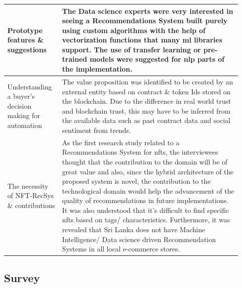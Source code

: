 \begin{longtable}{|p{0.22\linewidth}|p{0.72\linewidth}|}
\hline
Prototype features \& suggestions & The Data science experts were very interested in seeing a Recommendations System built purely using custom algorithms with the help of vectorization functions that many \gls{ml} libraries support. The use of transfer learning or pre-trained models were suggested for \gls{nlp} parts of the implementation.\\ 
\hline
Understanding a buyer's decision making for automation & The value proposition was identified to be created by an external entity based on contract \& token Ids stored on the blockchain. Due to the difference in real world trust and blockchain trust, this may have to be inferred from the available data such as past contract data and social sentiment from trends. \\ 
\hline
The necessity of NFT-RecSys \& contributions & As the first research study related to a Recommendations System for \gls{nft}s, the interviewees thought that the contribution to the domain will be of great value and also, since the hybrid architecture of the proposed system is novel, the contribution to the technological domain would help the advancement of the quality of recommendations in future implementations. It was also understood that it's difficult to find specific \gls{nft}s based on tags/ characteristics.
Furthermore, it was revealed that Sri Lanka does not have Machine Intelligence/ Data science driven Recommendation Systems in all local e-commerce stores.
\\ 
\hline

\end{longtable}


\subsection{Survey}

